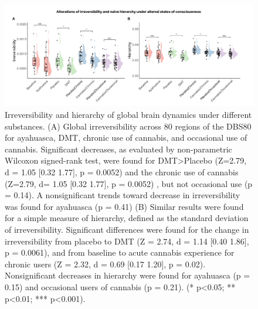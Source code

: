 \begin{figure}[h!]
    \centering
    \includegraphics[width=\textwidth]{images/Figure 2_ Nonreversibility.png}
    \caption[Irreversibility and hierarchy of global brain dynamics under
different substances.]{Irreversibility and hierarchy of global brain dynamics under
different substances. (A) Global irreversibility across 80
regions of the DBS80 for ayahuasca, DMT, chronic use of cannabis, and
occasional use of cannabis. Significant decreases,
as evaluated by non-parametric Wilcoxon signed-rank test, were found for DMT>Placebo (Z=2.79, d = 1.05 [0.32 1.77], p = 0.0052) and the
chronic use of cannabis (Z=2.79, d= 1.05 [0.32 1.77], p = 0.0052) , but not occasional use (p = 0.14). A nonsignificant trends
toward decrease in irreversibility was found for ayahuasca (p = 0.41) (B) Similar results were found for
a simple measure of hierarchy, defined as the standard deviation of
irreversibility. Significant differences were found for the change in
irreversibility from placebo to DMT (Z = 2.74, d = 1.14 [0.40 1.86], p = 0.0061), and from baseline to acute cannabis
experience for chronic users (Z = 2.32, d = 0.69 [0.17 1.20], p = 0.02). Nonsignificant decreases in hierarchy were
found for ayahuasca (p = 0.15) and occasional users of cannabis (p = 0.21). (* p\textless0.05;
** p\textless0.01; *** p\textless0.001).}
    \label{fig:ir}
\end{figure}

